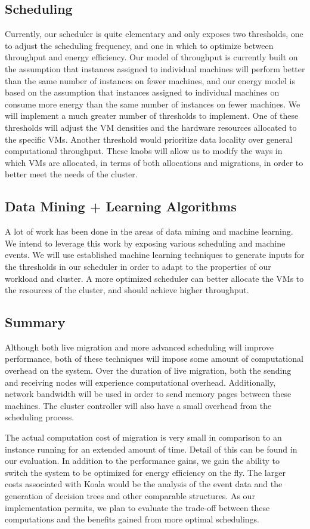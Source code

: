 \subsection{Scheduling}

Currently, our scheduler is quite elementary and only exposes two thresholds, one to adjust the scheduling frequency, and one in which to optimize between throughput and energy efficiency.  Our model of throughput is currently built on the assumption that instances assigned to individual machines will perform better than the same number of instances on fewer machines, and our energy model is based on the assumption that instances assigned to individual machines on consume more energy than the same number of instances on fewer machines.  We will implement a much greater number of thresholds to implement.  One of these thresholds will adjust the VM densities and the hardware resources allocated to the specific VMs.  Another threshold would prioritize data locality over general computational throughput.  These knobs will allow us to modify the ways in which VMs are allocated, in terms of both allocations and migrations, in order to better meet the needs of the cluster.

\subsection{Data Mining + Learning Algorithms}

A lot of work has been done in the areas of data mining and machine learning.  We intend to leverage this work by exposing various scheduling and machine events.  We will use established machine learning techniques to generate inputs for the thresholds in our scheduler in order to adapt to the properties of our workload and cluster.  A more optimized scheduler can better allocate the VMs to the resources of the cluster, and should achieve higher throughput.

\subsection{Summary}

Although both live migration and more advanced scheduling will improve performance, both of these techniques will impose some amount of computational overhead on the system.  Over the duration of live migration, both the sending and receiving nodes will experience computational overhead.  Additionally, network bandwidth will be used in order to send memory pages between these machines.  The cluster controller will also have a small overhead from the scheduling process.  

The actual computation cost of migration is very small in comparison to an instance running for an extended amount of time.  Detail of this can be found in our evaluation.  In addition to the performance gains, we gain the ability to switch the system to be optimized for energy efficiency on the fly.  The larger costs associated with Koala would be the analysis of the event data and the generation of decision trees and other comparable structures.  As our implementation permits, we plan to evaluate the trade-off between these computations and the benefits gained from more optimal schedulings. 